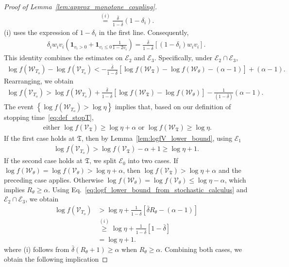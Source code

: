 \documentclass[11pt]{article}
\newcommand{\excess}{\alpha}
\newcommand{\bdelta}{\bar{\delta}}
\newcommand{\stopT}{{\boldsymbol{\mathfrak{T}}}}
\newcommand{\To}{{T_o}}
\newcommand{\rV}{\mathscr{V}}
\newcommand{\rW}{\mathscr{W}}
\newcommand{\cE}{\mathscr{E}}
\theoremstyle{named}
\theoremstyle{plain}
\newcommand{\brackets}[1]{\left[ #1 \right]}
\newcommand{\parenth}[1]{\left( #1 \right)}
\newcommand{\braces}[1]{\left\{ #1 \right \}}
\begin{document}
\begin{proof}[Proof of Lemma~\ref{lem:approx_monotone_coupling}]
\begin{align*}
  \overset{(i)}{=} \frac{\bdelta}{1-\bdelta} (1-\delta_i). 
\end{align*}
(i) uses the expression of $1-\delta_i$ in the first line. Consequently, 
\begin{align*}
  \delta_i w_i v_i \parenth{\mathbf{1}_{v_i > 0} + \mathbf{1}_{v_i \leq 0} \frac{1}{1-2v_i} } = \frac{\bdelta}{1-\bdelta}  \brackets{(1-\delta_i) w_i v_i}.
\end{align*}
This identity combines the estimates on $\cE_2$ and $\cE_3$. Specifically, under $\cE_2 \cap \cE_3$,
\begin{align*}
  \log f(\rW_\To) - \log f(\rV_\To) < -\frac{\bdelta}{1-\bdelta} \brackets{\log f(\rW_\stopT) - \log f(\rW_\theta) - (\excess - 1)} + (\excess - 1).
\end{align*}
Rearranging, we obtain
\begin{align}
  \label{eq:logf_lower_bound_from_stochastic_calculus}
  \log f(\rV_\To) >  \log f(\rW_\To) + \frac{\bdelta}{1-\bdelta} \brackets{\log f(\rW_\stopT) - \log f(\rW_\theta)} - \frac{1}{(1-\bdelta)}(\excess - 1). 
\end{align}
The event $\braces{\log f(\rW_\To) > \log \eta}$ implies that, based on our definition of stopping time~\eqref{eq:def_stopT}, 
\begin{align*}
  \text{ either } \log f(\rV_\stopT) \geq \log \eta + \excess \text{ or } \log f(\rW_\stopT) \geq \log\eta.
\end{align*}
If the first case holds at $\stopT$, then by Lemma~\ref{lem:logfV_lower_bound}, using $\cE_1$
\begin{align*}
  \log f(\rV_\To) > \log f(\rV_\stopT) - \excess + 1  \geq \log \eta + 1.
\end{align*}
If the second case holds at $\stopT$, we split $\cE_0$ into two cases. If $\log f(\rW_\theta) = \log f(\rV_\theta) > \log \eta + \excess$, then $\log f(\rV_\stopT) > \log \eta + \excess$ and the preceding case applies. Otherwise $\log f(\rW_\theta) = \log f(\rV_\theta) \leq \log \eta - \excess$, which implies $R_\theta \geq \excess$. Using Eq.~\eqref{eq:logf_lower_bound_from_stochastic_calculus} and $\cE_2 \cap \cE_3$, we obtain
\begin{align*}
  \log f(\rV_\To) &>  \log \eta + \frac{1}{1-\bdelta}\brackets{\bdelta  R_\theta - (\excess - 1)} \\
  &\overset{(i)}{\geq} \log \eta + \frac{1}{1-\bdelta} \brackets{1 - \bdelta} \\
  &= \log \eta + 1.
\end{align*}
where (i) follows from $\bdelta (R_\theta + 1) \geq \excess$ when $R_\theta \geq \excess$. Combining both cases, we obtain the following implication 

\end{proof}
\end{document}
